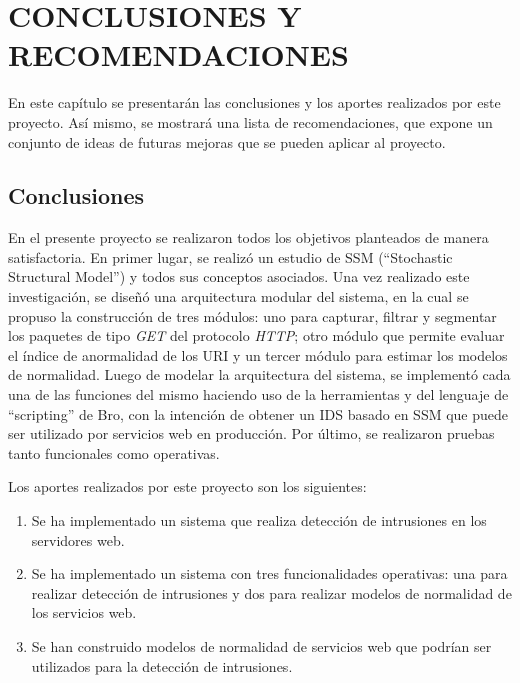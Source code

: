 \chapter{CONCLUSIONES Y RECOMENDACIONES}
\label{conclusiones}

En este capítulo se presentarán las conclusiones y los aportes realizados por este proyecto. Así mismo, se mostrará una lista de recomendaciones, que expone un conjunto de ideas de futuras mejoras que se pueden aplicar al proyecto.

\section{Conclusiones}

En el presente proyecto se realizaron todos los objetivos planteados de manera satisfactoria. En primer lugar, se realizó un estudio de SSM (``Stochastic Structural Model'') \cite{ssm} y todos sus conceptos asociados. Una vez realizado este investigación, se diseñó una arquitectura modular del sistema, en la cual se propuso la construcción de tres módulos: uno para capturar, filtrar y segmentar los paquetes de tipo \textit{GET} del protocolo \textit{HTTP}; otro módulo que permite evaluar el índice de anormalidad de los URI y un tercer módulo para estimar los modelos de normalidad. Luego de modelar la arquitectura del sistema, se implementó cada una de las funciones del mismo haciendo uso de la herramientas y del lenguaje de ``scripting'' de Bro, con la intención de obtener un IDS basado en SSM que puede ser utilizado por servicios web en producción. Por último, se realizaron pruebas tanto funcionales como operativas. 

Los aportes realizados por este proyecto son los siguientes:

\begin{enumerate}
\item Se ha implementado un sistema que realiza detección de intrusiones en los servidores web.
\item Se ha implementado un sistema con tres funcionalidades operativas: una para realizar detección de intrusiones y dos para realizar modelos de normalidad de los servicios web.
\item Se han construido modelos de normalidad de servicios web que podrían ser utilizados para la detección de intrusiones.
\end{enumerate}

